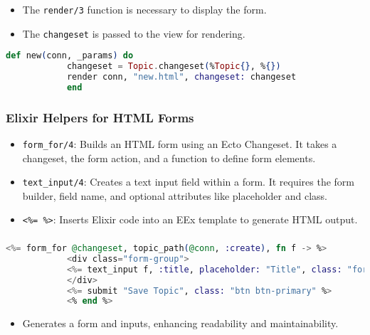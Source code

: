 \documentclass[aspectratio=169, table]{beamer}
\begin{document}
	\begin{frame}[fragile]
		\frametitle{}
		\begin{itemize}
			\item The \texttt{render/3} function is necessary to display the form.
			\item The \texttt{changeset} is passed to the view for rendering.
		\end{itemize}
		\begin{lstlisting}[language=Elixir]
			def new(conn, _params) do
			changeset = Topic.changeset(%Topic{}, %{})
			render conn, "new.html", changeset: changeset
			end
		\end{lstlisting}
	\end{frame}
	
	\begin{frame}[fragile]
		\frametitle{Elixir Helpers for HTML Forms}
		\begin{itemize}
			\item \texttt{form\_for/4}: Builds an HTML form using an Ecto Changeset. It takes a changeset, the form action, and a function to define form elements.
			\item \texttt{text\_input/4}: Creates a text input field within a form. It requires the form builder, field name, and optional attributes like placeholder and class.
			\item \texttt{<\%= \%>}: Inserts Elixir code into an EEx template to generate HTML output.
		\end{itemize}
	\end{frame}
	
	\begin{frame}[fragile]
		\frametitle{}
		\begin{lstlisting}[language=Elixir]
			<%= form_for @changeset, topic_path(@conn, :create), fn f -> %>
			<div class="form-group">
			<%= text_input f, :title, placeholder: "Title", class: "form-control" %>
			</div>
			<%= submit "Save Topic", class: "btn btn-primary" %>
			<% end %>
		\end{lstlisting}
		\begin{itemize}
			\item Generates a form and inputs, enhancing readability and maintainability.
		\end{itemize}
	\end{frame}
	
\end{document}
